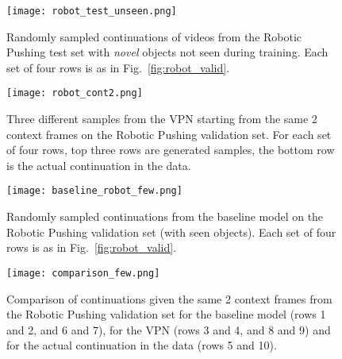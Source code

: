 \documentclass{article}
\newcommand{\figref}[1]{Fig.~\ref{#1}}
\begin{document}
\begin{figure}

\texttt{[image: robot\_test\_unseen.png]}
\caption{Randomly sampled continuations of videos from the Robotic Pushing test set with \emph{novel} objects not seen during training. Each set of four rows is as in \figref{fig:robot_valid}. }
\label{fig:robot_novel}
\end{figure}

\begin{figure}

\texttt{[image: robot\_cont2.png]}
\caption{Three different samples from the VPN starting from the same 2 context frames on the Robotic Pushing validation set. For each set of four rows, top three rows are generated samples, the bottom row is the actual continuation in the data.}
\label{fig:robot_cont}
\end{figure}


\begin{figure}
\texttt{[image: baseline\_robot\_few.png]}
\caption{Randomly sampled continuations from the baseline model on the Robotic Pushing validation set (with seen objects). Each set of four rows is as in \figref{fig:robot_valid}. }
\label{fig:robot_base}
\end{figure}


\begin{figure}

\texttt{[image: comparison\_few.png]}
\caption{Comparison of continuations given the same 2 context frames from the Robotic Pushing validation set for the baseline model (rows 1 and 2, and 6 and 7), for the VPN (rows 3 and 4, and 8 and 9) and for the actual continuation in the data (rows 5 and 10).}
\label{fig:robot_comp}
\end{figure}
\end{document}
